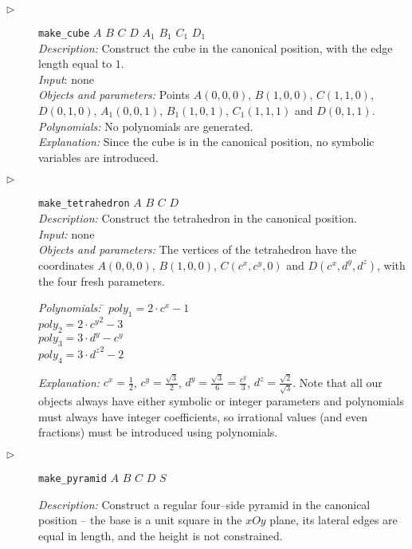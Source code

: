 \documentclass[final,1p,times,authoryear]{elsarticle}
\begin{document}
\begin{description}
\item[$\triangleright$] {\tt make\_cube} $A$ $B$ $C$ $D$ $A_1$ $B_1$ $C_1$ $D_1$\\
  {\em Description:} Construct the cube in the canonical position, with the edge length equal to $1$.\\
  {\em Input}: none\\
  {\em Objects and parameters:} Points $A(0, 0, 0)$, $B(1, 0, 0)$,
  $C(1, 1, 0)$, $D(0, 1, 0)$, $A_1(0, 0, 1)$, $B_1(1, 0, 1)$,
  $C_1(1, 1, 1)$ and $D(0, 1, 1)$.\\
  {\em Polynomials:} No polynomials are generated. \\
  {\em Explanation:} Since the cube is in the canonical position, no
  symbolic variables are introduced.

\item[$\triangleright$] {\tt make\_tetrahedron} $A$ $B$ $C$ $D$\label{tetrahedron}\\
  {\em Description: }Construct the tetrahedron in the canonical
  position.\\
  {\em Input: } none\\
  {\em Objects and parameters:} The vertices of the tetrahedron have
  the coordinates $A(0, 0, 0)$, $B(1, 0, 0)$, $C(c^x, c^y, 0)$ and
  $D(c^x, d^y, d^z)$, with the four fresh parameters.
\begin{tabbing}
{\em Polynomials:} \= $poly_1 = 2\cdot c^x - 1$ \\
                   \> $poly_2 = 2\cdot {c^y}^2 - 3$ \\
                   \> $poly_3 = 3\cdot d^y - c^y$ \\
                   \> $poly_4 = 3\cdot {d^z}^2 - 2$
\end{tabbing}

{\em Explanation:} $c^x = \frac{1}{2}$, $c^y = \frac{\sqrt{3}}{2}$,
$d^y = \frac{\sqrt{3}}{6} = \frac{c^y}{3}$, $d^z =
\frac{\sqrt{2}}{\sqrt{3}}$. Note that all our objects always have
either symbolic or integer parameters and polynomials must always have
integer coefficients, so irrational values (and even fractions) must
be introduced using polynomials.

\item[$\triangleright$] {\tt make\_pyramid} $A$ $B$ $C$ $D$ $S$

  {\em Description:} Construct a regular four--side pyramid in the
  canonical position -- the base is a unit square in the $xOy$ plane,
  its lateral edges are equal in length, and the height is not
  constrained.
  

\end{description}
\end{document}
